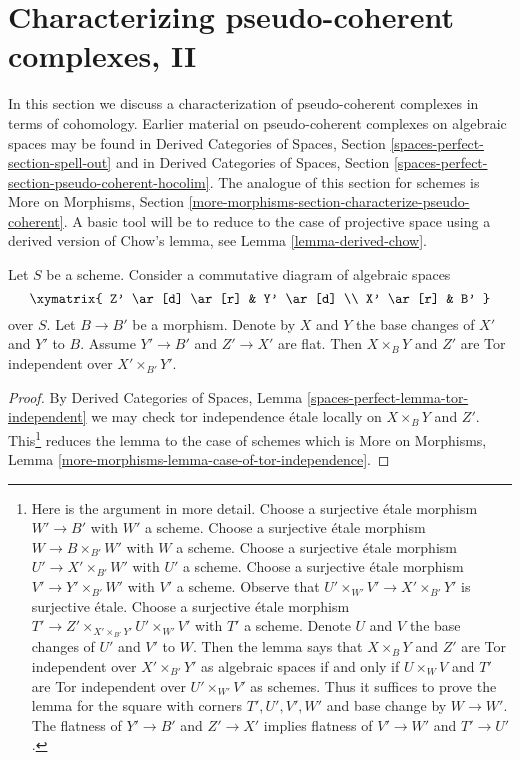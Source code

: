 \section{Characterizing pseudo-coherent complexes, II}
\label{section-characterize-pseudo-coherent}

\noindent
In this section we discuss a characterization of pseudo-coherent complexes
in terms of cohomology. Earlier material on pseudo-coherent complexes
on algebraic spaces may be found in
Derived Categories of Spaces, Section
\ref{spaces-perfect-section-spell-out}
and in
Derived Categories of Spaces, Section
\ref{spaces-perfect-section-pseudo-coherent-hocolim}.
The analogue of this section for schemes is More on Morphisms, Section
\ref{more-morphisms-section-characterize-pseudo-coherent}.
A basic tool will be to reduce to the case of projective space
using a derived version of Chow's lemma, see
Lemma \ref{lemma-derived-chow}.

\begin{lemma}
\label{lemma-case-of-tor-independence}
Let $S$ be a scheme. Consider a commutative diagram of algebraic spaces
$$
\xymatrix{
Z' \ar[d] \ar[r] & Y' \ar[d] \\
X' \ar[r] & B'
}
$$
over $S$.
Let $B \to B'$ be a morphism. Denote by $X$ and $Y$ the base
changes of $X'$ and $Y'$ to $B$.
Assume $Y' \to B'$ and $Z' \to X'$ are flat.
Then $X \times_B Y$ and $Z'$ are Tor independent over $X' \times_{B'} Y'$.
\end{lemma}

\begin{proof}
By Derived Categories of Spaces, Lemma
\ref{spaces-perfect-lemma-tor-independent}
we may check tor independence \'etale locally on $X \times_B Y$
and $Z'$. This\footnote{Here is the argument in more detail.
Choose a surjective \'etale morphism $W' \to B'$
with $W'$ a scheme. Choose a surjective \'etale morphism
$W \to B \times_{B'} W'$ with $W$ a scheme. Choose a
surjective \'etale morphism
$U' \to X' \times_{B'} W'$ with $U'$ a scheme. Choose a
surjective \'etale morphism $V' \to Y' \times_{B'} W'$ with $V'$ a scheme.
Observe that $U' \times_{W'} V' \to X' \times_{B'} Y'$ is surjective
\'etale. Choose a surjective \'etale morphism
$T' \to Z' \times_{X' \times_{B'} Y'} U' \times_{W'} V'$
with $T'$ a scheme. Denote $U$ and $V$ the base changes of $U'$ and $V'$
to $W$. Then the lemma says that $X \times_B Y$ and $Z'$
are Tor independent over $X' \times_{B'} Y'$ as algebraic spaces
if and only if $U \times_W V$ and $T'$ are Tor independent over
$U' \times_{W'} V'$ as schemes. Thus
it suffices to prove the lemma for
the square with corners $T', U', V', W'$ and base change by $W \to W'$.
The flatness of $Y' \to B'$ and $Z' \to X'$ implies flatness
of $V' \to W'$ and $T' \to U'$.}
reduces the lemma to the case of schemes
which is More on Morphisms, Lemma
\ref{more-morphisms-lemma-case-of-tor-independence}.
\end{proof}

